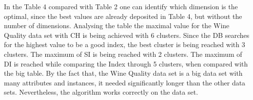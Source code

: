 In the Table 4 compared with Table 2 one can identify which dimension is the optimal, since the best values are already deposited in Table 4, but without the number of dimensions.
Analysing the table the maximal value for the Wine Quality data set with CH is being achieved with 6 clusters.\newline
Since the DB searches for the highest value to be a good index, the best cluster is being reached with  3 clusters. The maximum of SI is being reached with 2 clusters. The maximum of DI is reached while comparing the Index through 5 clusters, when compared with the big table. \newline
By the fact that, the Wine Quality data set is a big data set with many attributes and instances, it needed significantly longer than the other data sets. Nevertheless, the algorithm works correctly on the data set. \newline